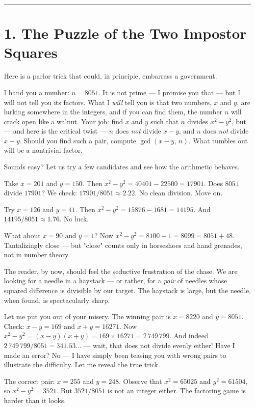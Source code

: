 \documentclass[11pt,openany]{book}
\theoremstyle{definition}
\theoremstyle{plain}
\theoremstyle{remark}
\begin{document}
\bigskip\noindent\rule{\textwidth}{0.4pt}\bigskip


\section{1. The Puzzle of the Two Impostor Squares}


Here is a parlor trick that could, in principle, embarrass a government.

I hand you a number: $n = 8051$. It is not prime — I promise you that — but I will not tell you its factors. What I \textit{will} tell you is that two numbers, $x$ and $y$, are lurking somewhere in the integers, and if you can find them, the number $n$ will crack open like a walnut. Your job: find $x$ and $y$ such that $n$ divides $x^2 - y^2$, but — and here is the critical twist — $n$ does \textit{not} divide $x - y$, and $n$ does \textit{not} divide $x + y$. Should you find such a pair, compute $\gcd(x - y, \, n)$. What tumbles out will be a nontrivial factor.

Sounds easy? Let us try a few candidates and see how the arithmetic behaves.

Take $x = 201$ and $y = 150$. Then $x^2 - y^2 = 40401 - 22500 = 17901$. Does $8051$ divide $17901$? We check: $17901 / 8051 \approx 2.22$. No clean division. Move on.

Try $x = 126$ and $y = 41$. Then $x^2 - y^2 = 15876 - 1681 = 14195$. And $14195 / 8051 \approx 1.76$. No luck.

What about $x = 90$ and $y = 1$? Now $x^2 - y^2 = 8100 - 1 = 8099 = 8051 + 48$. Tantalizingly close — but "close" counts only in horseshoes and hand grenades, not in number theory.

The reader, by now, should feel the seductive frustration of the chase. We are looking for a needle in a haystack — or rather, for a \textit{pair} of needles whose squared difference is divisible by our target. The haystack is large, but the needle, when found, is spectacularly sharp.

Let me put you out of your misery. The winning pair is $x = 8220$ and $y = 8051$. Check: $x - y = 169$ and $x + y = 16271$. Now $x^2 - y^2 = (x-y)(x+y) = 169 \times 16271 = 2\,749\,799$. And indeed $2\,749\,799 / 8051 = 341.53\ldots$ — wait, that does not divide evenly either! Have I made an error? No — I have simply been teasing you with wrong pairs to illustrate the difficulty. Let me reveal the true trick.

The correct pair: $x = 255$ and $y = 248$. Observe that $x^2 = 65025$ and $y^2 = 61504$, so $x^2 - y^2 = 3521$. But $3521 / 8051$ is not an integer either. The factoring game is harder than it looks.
\end{document}
